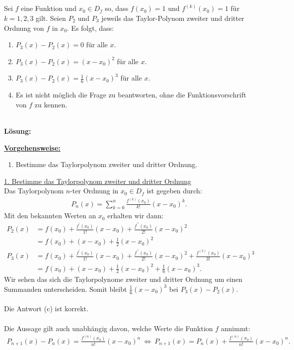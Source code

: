\subsection*{}
Sei $f$ eine Funktion und $x_0 \in D_f$ so, dass $f(x_0) = 1$ und $f^{(k)}(x_0) = 1$ für $k = 1,2,3$ gilt. Seien $P_2$ und $P_3$ jeweils das Taylor-Polynom zweiter und dritter Ordnung von $f$ in $x_0$. Es folgt, dass:
\renewcommand{\labelenumi}{(\alph{enumi})}
\begin{enumerate}
	\item 
	$P_3(x) - P_2(x) = 0 $ für alle $x$.
	\item
	$P_3(x) - P_2(x) = (x - x_0)^2 $ für alle $x$.
	\item
	$P_3(x) - P_2(x) = \frac{1}{6} (x - x_0)^3 $ für alle $x$.
	\item
	Es ist nicht möglich die Frage zu beantworten, ohne die Funktionsvorschrift von $f$ zu kennen.
\end{enumerate}
\ \\
\textbf{Lösung:}
\begin{mdframed}
	\underline{\textbf{Vorgehensweise:}}
	\renewcommand{\labelenumi}{\theenumi.}
	\begin{enumerate}
		\item Bestimme das Taylorpolynom zweiter und dritter Ordnung.
	\end{enumerate}
\end{mdframed}

\underline{1. Bestimme das Taylorpolynom zweiter und dritter Ordnung}\\
Das Taylorpolynom $n$-ter Ordnung in $x_0 \in D_f$ ist gegeben durch:
\begin{align*}
	P_n(x)
	=
	\sum \limits_{k=0}^n \frac{f^{(k)}(x_0)}{k!} (x-x_0)^k.
\end{align*}
Mit den bekannten Werten an $x_0$ erhalten wir dann:
\begin{align*}
	P_2(x)
	&=
	f(x_0) + \frac{f^\prime(x_0)}{1!} (x- x_0) + \frac{f^{\prime \prime}(x_0)}{2!} (x- x_0)^2\\
	&=
	f(x_0) +  (x- x_0) + \frac{1}{2} (x- x_0)^2\\
	P_3(x)
	&=
	f(x_0) + \frac{f^\prime(x_0)}{1!} (x- x_0) + \frac{f^{\prime \prime}(x_0)}{2!} (x- x_0)^2
	+ \frac{f^{(3)}(x_0)}{3!} (x - x_0)^3\\
	&=
	f(x_0) +  (x- x_0) + \frac{1}{2} (x- x_0)^2 + \frac{1}{6} (x - x_0 )^3.
\end{align*}
Wir sehen das sich die Taylorpolynome zweiter und dritter Ordnung um einen Summanden unterscheiden. Somit bleibt $\frac{1}{6} (x - x_0)^3$ bei $P_3(x) - P_2(x)$.\\
\\
Die Antwort (c) ist korrekt.\\
\\
Die Aussage gilt auch unabhängig davon, welche Werte die Funktion $f$ annimmt:
\begin{align*}
	P_{n+1}(x) - P_n(x) = 
	\frac{f^{(n)}(x_0)}{n!}(x - x_0)^n
	\ \Leftrightarrow \
	P_{n+1}(x) =  P_n(x) + \frac{f^{(n)}(x_0)}{n!}(x - x_0)^n. 
\end{align*} 

